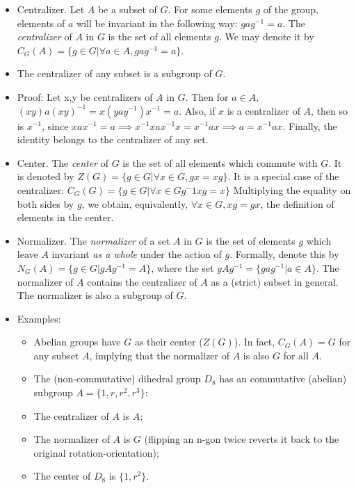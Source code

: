 \documentclass[1    0pt, answers]{exam} \renewcommand{\baselinestretch}{1.05}
\theoremstyle{plain}
\theoremstyle{definition}
\begin{document}
\begin{questions}
\begin{itemize}
\item Centralizer. Let $A$ be a subset of $G$. For some elements $g$ of the group, elements of $a$ will be invariant in the following way: $g a g^{-1} = a$. The \emph{centralizer} of $A$ in $G$ is the set of all elements $g$. We may denote it by $C_{G}(A) = \{ g \in G | \forall a \in A,  g a g^{-1} = a \}$.
\item The centralizer of any subset is a subgroup of $G$.
\item Proof: Let x,y be centralizers of $A$ in $G$. Then for $a \in A$, $(xy) a (xy)^{-1} = x(yay^{-1})x^{-1} = a$. Also, if $x$ is a centralizer of $A$, then so is $x^{-1}$, since $x a x^{-1} = a \implies x^{-1}x a x^{-1}x = x^{-1} a x \implies a = x^{-1} a x$. Finally, the identity belongs to the centralizer of any set.
\item Center. The \emph{center} of $G$ is the set of all elements which commute with $G$. It is denoted by $Z(G) = \{ g \in G | \forall x \in G, gx = xg \}$. It is a special case of the centralizer: $C_G (G) = \{ g \in G | \forall x \in G g^-1 x g = x \}$ Multiplying the equality on both sides by $g$, we obtain, equivalently, $\forall x \in G, x g = g x $, the definition of elements in the center.
\item Normalizer. The \emph{normalizer} of a set $A$ in $G$ is the set of elements $g$ which leave $A$ invariant \emph{as a whole}  under the action of $g$. Formally, denote this by $N_G (A) = \{ g \in G | g A g^{-1} = A \}$, where the set $g A g^{-1} = \{ g a g^{-1} | a \in A \}$. The normalizer of $A$ contains the centralizer of $A$ as a (strict) subset in general. The normalizer is also a subgroup of $G$.
\item Examples:
\begin{itemize}
    \item Abelian groups have $G$ as their center ($Z(G)$). In fact, $C_G (A) = G$ for any subset $A$, implying that the normalizer of $A$ is also $G$ for all $A$.
    \item The (non-commutative) dihedral group $D_8$ has an commutative (abelian) subgroup $A = \{ 1, r, r^2, r^3 \}$:
    \item The centralizer of $A$ is $A$;
    \item The normalizer of $A$ is $G$ (flipping an n-gon twice reverts it back to the original rotation-orientation);
    \item The center of $D_8$ is $\{1, r^2 \}$.

\end{itemize}
\end{itemize}
\end{questions}
\end{document}
